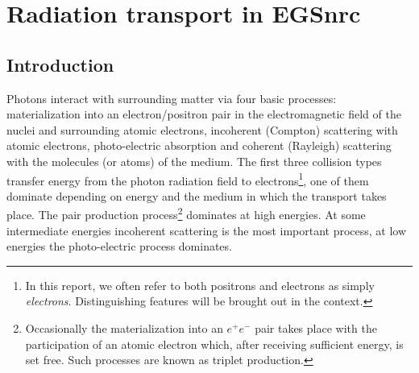 
%
%
%
%
%
%
%
%
%


\section{Radiation transport in EGSnrc}
\label{section_2}

\subsection{Introduction}


Photons interact with surrounding matter via four
basic processes: materialization into an electron/positron pair
in the electromagnetic field of the nuclei and surrounding
atomic electrons, incoherent (Compton) scattering with
atomic electrons,
photo-electric absorption and
coherent (Rayleigh) scattering with
the molecules (or atoms) of the medium. The first three
collision types transfer energy from the photon radiation
field to electrons\footnote{In this report, we often refer to
both positrons and electrons as simply {\it electrons}.
Distinguishing features will be brought out in the context.},
one of them dominate depending on energy and the medium
in which the transport takes place. The pair production
process\footnote{Occasionally the materialization into an $e^+e^-$ pair
takes place with the participation of an atomic electron which, after
receiving sufficient energy, is set free. Such processes are known
as triplet production.} dominates at high energies.
At some intermediate energies incoherent scattering is the most
important process, at low energies the photo-electric process
dominates.

